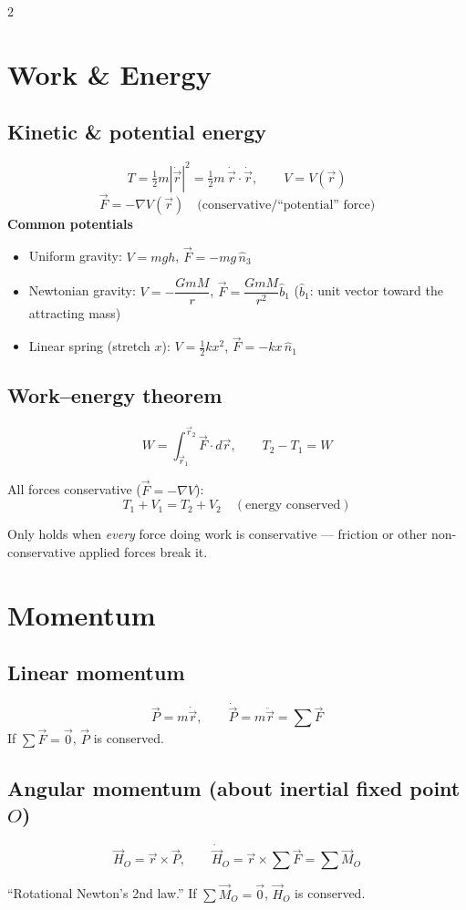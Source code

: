 \documentclass[10pt]{article}
\begin{document}
\begin{multicols}{2}
\section*{Work \& Energy}
\subsection*{Kinetic \& potential energy}
\[
    T=\tfrac12 m|\dot{\vec r}|^{2}=\tfrac12 m\,\dot{\vec r}\cdot\dot{\vec r},
    \qquad
    V=V(\vec r)
\]
\[
    \vec F=-\nabla V(\vec r)\quad\text{(conservative/``potential'' force)}
\]
\textbf{Common potentials}
\begin{itemize}[nosep, leftmargin=1.1em]
    \item Uniform gravity: $V=mgh$, $\vec F=-mg\,\hat n_3$
    \item Newtonian gravity: $V=-\dfrac{GmM}{r}$, $\vec F=\dfrac{GmM}{r^{2}}\hat b_1$ ($\hat b_1$: unit vector toward the attracting mass)
    \item Linear spring (stretch $x$): $V=\tfrac12 kx^{2}$, $\vec F=-kx\,\hat n_1$
\end{itemize}
\subsection*{Work--energy theorem}
\[
    W=\int_{\vec r_1}^{\vec r_2}\vec F\cdot d\vec r, \qquad T_2-T_1=W
\]
\begin{keybox}
All forces conservative ($\vec F=-\nabla V$):
\[
    T_1+V_1=T_2+V_2 \quad(\text{energy conserved})
\]
\end{keybox}
Only holds when \emph{every} force doing work is conservative --- friction or other non-conservative applied forces break it.

\section*{Momentum}
\subsection*{Linear momentum}
\[
    \vec P=m\dot{\vec r}, \qquad \dot{\vec P}=m\ddot{\vec r}=\textstyle\sum\vec F
\]
If $\sum\vec F=\vec 0$, $\vec P$ is conserved.
\subsection*{Angular momentum (about inertial fixed point $O$)}
\begin{keybox}
\[
    \vec H_O=\vec r\times\vec P, \qquad \dot{\vec H}_O=\vec r\times\textstyle\sum\vec F=\textstyle\sum\vec M_O
\]
\end{keybox}
``Rotational Newton's 2nd law.'' If $\sum\vec M_O=\vec 0$, $\vec H_O$ is conserved.


\end{multicols}
\end{document}
